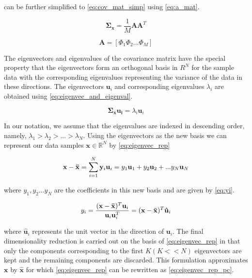 \documentclass[headings=optiontoheadandtoc,listof=totoc,parskip=full]{scrartcl}
\def \reals {\mathbb{R}}
\begin{document}
 can be further simplified to \cref{eq:cov_mat_simp} using \cref{eq:a_mat}.

\begin{equation}\label{eq:cov_mat_simp}
    \mathbf{\Sigma_x} = \frac{1}{M}\mathbf{A}\mathbf{A}^T
\end{equation}

\begin{equation}\label{eq:a_mat}
    \mathbf{A} = [\Phi_1 \Phi_2 ... \Phi_M]    
\end{equation}

The eigenvectors and eigenvalues of the covariance matrix have the special property that the eigenvectors form an orthogonal basis in $R^N$ for the sample data with the corresponding eigenvalues representing the variance of the data in these directions. The eigenvectors $\mathbf{u}_i$ and corresponding eigenvalues $\lambda_i$ are obtained using \cref{eq:eigenvec_and_eigenval}.

\begin{equation}\label{eq:eigenvec_and_eigenval}
    \mathbf{\Sigma_x}\mathbf{u_i} = \lambda_i\mathbf{u}_i
\end{equation}

In our notation, we assume that the eigenvalues are indexed in descending order, namely, $\lambda_1 > \lambda_2 > ... > \lambda_N$. Using the eigenvectors as the new basis we can represent our data samples $\mathbf{x} \in \reals^N$ by \cref{eq:eigenvec_rep}

\begin{equation}\label{eq:eigenvec_rep}
    \mathbf{x} - \mathbf{\Bar{x}} = \sum_{i = 1}^N \mathbf{y}_i\mathbf{u}_i = y_1\mathbf{u}_1 + y_2\mathbf{u}_2 + ... y_N\mathbf{u}_N
\end{equation}

where $y_1, y_2 ... y_N$ are the coefficients in this new basis and are given by \cref{eq:yi}.

\begin{equation}\label{eq:yi}
    y_i = \frac{(\mathbf{x} - \mathbf{\Bar{x}})^T \mathbf{u}_i}{\mathbf{u}_i\mathbf{u}_i^T} = (\mathbf{x} - \mathbf{\Bar{x}})^T\mathbf{\hat{u}}_i
\end{equation}

where $\mathbf{\hat{u}}_i$ represents the unit vector in the direction of $\mathbf{u}_i$. The final dimensionality reduction is carried out on the basis of \cref{eq:eigenvec_rep} in that only the components corresponding to the first $K (K << N)$ eigenvectors are kept and the remaining components are discarded. This formulation approximates $\mathbf{x}$ by $\mathbf{\hat{x}}$ for which \cref{eq:eigenvec_rep} can be rewritten as \cref{eq:eigenvec_rep_pc}.
\end{document}
